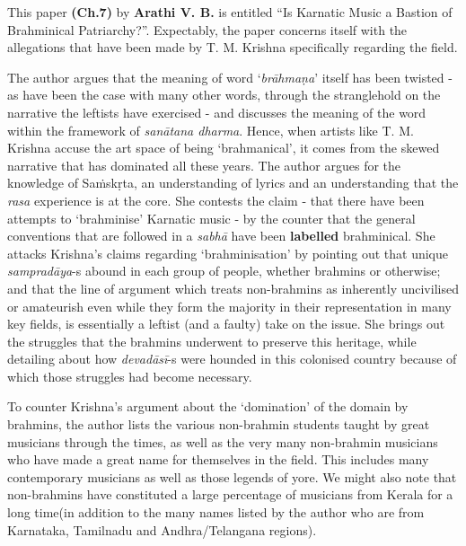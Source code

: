 \vspace{-.1cm}

This paper \textbf{(Ch.7)} by \textbf{Arathi V. B.} is entitled “Is Karnatic Music a Bastion of Brahminical Patriarchy?”. Expectably, the paper concerns itself with the allegations that have been made by T. M. Krishna specifically regarding the field.

\vspace{-.1cm}

The author argues that the meaning of word ‘\textit{brāhmaṇa}’ itself has been twisted - as have been the case with many other words, through the stranglehold on the narrative the leftists have exercised - and discusses the meaning of the word within the framework of \textit{sanātana dharma}. Hence, when artists like T. M. Krishna accuse the art space of being ‘brahmanical’, it comes from the skewed narrative that has dominated all these years. The author argues for the knowledge of Saṁskṛta, an understanding of lyrics and an understanding that the \textit{rasa} experience is at the core. She contests the claim - that there have been attempts to ‘brahminise’ Karnatic music - by the counter that the general conventions that are followed in a \textit{sabhā} have been \textbf{labelled} brahminical. She attacks Krishna’s claims regarding ‘brahminisation’ by pointing out that unique \textit{sampradāya}-s abound in each group of people, whether brahmins or otherwise; and that the line of argument which treats non-brahmins as inherently uncivilised or amateurish even while they form the majority in their representation in many key fields, is essentially a leftist (and a faulty) take on the issue. She brings out the struggles that the brahmins underwent to preserve this heritage, while detailing about how \textit{devadāsī}-s were hounded in this colonised country because of which those struggles had become necessary.

\vspace{-.1cm}

To counter Krishna’s argument about the ‘domination’ of the domain by brahmins, the author lists the various non-brahmin students taught by great musicians through the times, as well as the very many non-brahmin musicians who have made a great name for themselves in the field. This includes many contemporary musicians as well as those legends of yore. We might also note that non-brahmins have constituted a large percentage of musicians from Kerala for a long time(in addition to the many names listed by the author who are from Karnataka, Tamilnadu and Andhra/Telangana regions).


